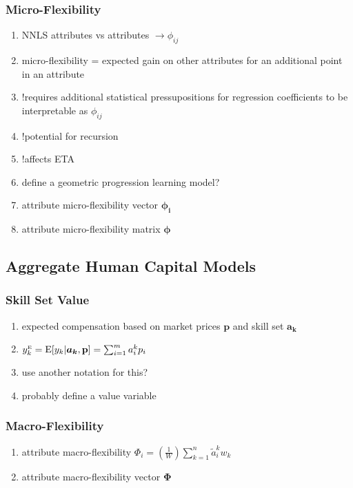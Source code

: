 \documentclass{elsarticle} %
\begin{document}
\subsubsection{Micro-Flexibility}
\begin{enumerate}
    \item NNLS attributes vs attributes $\rightarrow \phi_{ij}$
    \item micro-flexibility = expected gain on other attributes for an additional point
          in an attribute
    \item !requires additional statistical pressupositions for regression coefficients to be interpretable as $\phi_{ij}$
    \item !potential for recursion
    \item !affects ETA
    \item define a geometric progression learning model?
    \item attribute micro-flexibility vector $\boldsymbol{\phi_{i}}$
    \item attribute micro-flexibility matrix $\boldsymbol{\phi}$
\end{enumerate}

\subsection{Aggregate Human Capital Models}
\subsubsection{Skill Set Value}
\begin{enumerate}
    \item expected compensation based on market prices $\textbf{p}$ and skill set
          $\boldsymbol{a_k}$
    \item $y_{k}^{\text{\tiny{E}}} = \text{E}[y_k | \boldsymbol{a_k}, \textbf{p}] = \sum_{i=1}^{m}{a_{i}^{k} p_i}$
    \item use another notation for this?
    \item probably define a value variable
\end{enumerate}

\subsubsection{Macro-Flexibility}
\begin{enumerate}
    \item attribute macro-flexibility $\Phi_i = \left( \frac{1}{W} \right)
              \sum_{k=1}^{n}{\tilde{a}_{i}^{k} w_k}$
    \item attribute macro-flexibility vector $\boldsymbol{\Phi}$
\end{enumerate}
\end{document}

